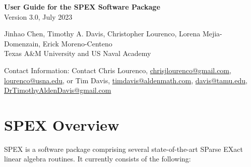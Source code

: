 \documentclass[12pt]{report}
\theoremstyle{definition}
\begin{document}
\begin{center}
\begin{large}
\textbf{User Guide for the SPEX Software Package} \\
\vspace{5mm}
Version 3.0, July 2023 %
\vspace{20mm}

Jinhao Chen,  Timothy A. Davis, Christopher Lourenco, Lorena Mejia-Domenzain, Erick Moreno-Centeno  \\

Texas A\&M University and US Naval Academy

\vspace{20mm}
Contact Information: Contact Chris Lourenco, \href{mailto:chrisjlourenco@gmail.com}{chrisjlourenco@gmail.com}, \href{mailto:lourenco@usna.edu}{lourenco@usna.edu}, or Tim Davis,
\href{mailto:timdavis@aldenmath.com}{timdavis@aldenmath.com},
\href{mailto:davis@tamu.edu}{davis@tamu.edu},
\href{DrTimothyAldenDavis@gmail.com}{DrTimothyAldenDavis@gmail.com}

\end{large}
\end{center}

\newpage
\tableofcontents

\newpage
    
\chapter{SPEX Overview}

SPEX is a software package comprising several state-of-the-art SParse EXact
linear algebra routines. It currently consists of the following:
\end{document}
